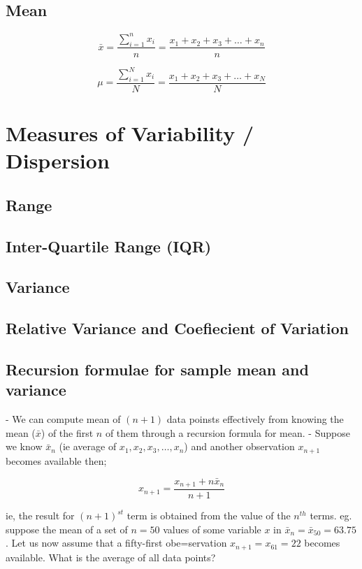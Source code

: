 \documentclass[12pt,a4paper]{article}
\begin{document}
\subsection{Mean}

\begin{equation}
    \bar{x} = \frac{\sum_{i = 1}^{n} x_i}{n}= \frac{x_1 + x_2 + x_3 + \ldots + x_n}{n}
\end{equation}

\begin{equation}
    \mu = \frac{\sum_{i = 1}^{N} x_i}{N}= \frac{x_1 + x_2 + x_3 + \ldots + x_N}{N}
\end{equation}


\section{Measures of Variability / Dispersion}

\subsection{Range}
\subsection{Inter-Quartile Range (IQR)}
\subsection{Variance}
\subsection{Relative Variance and Coefiecient of Variation}
\subsection{Recursion formulae for sample mean and variance}
- We can compute mean of $(n + 1)$ data poinsts effectively from knowing the mean ($\bar{x}$) of the first $n$ of them through a recursion formula for mean.
- Suppose we know $\bar{x}_{n}$ (ie average of $x_1, x_2, x_3, \dots, x_n$) and another observation $x_{n+1}$ becomes available then;

\begin{equation}
    x_{n + 1} = \frac{x_{n+1} + n\bar{x}_n}{n + 1}
\end{equation}

ie, the result for $(n + 1)^{st}$ term is obtained from the value of the $n^{th}$ terms.
eg. suppose the mean of a set of $n = 50$ values of some variable $x$ in $\bar{x}_n = \bar{x}_{50} = 63.75$. Let us now assume that a fifty-first obe=servation $x_{n + 1} = x_{61} = 22$ becomes available. What is the average of all data points?
\end{document}
